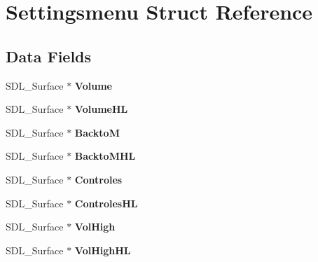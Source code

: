 \hypertarget{structSettingsmenu}{}\section{Settingsmenu Struct Reference}
\label{structSettingsmenu}
\subsection*{Data Fields}
\begin{DoxyCompactItemize}
\item 
\mbox{\label{structSettingsmenu_a1a07d214d54f3ad70eede8e2967cc355}} 
S\+D\+L\+\_\+\+Surface $\ast$ {\bfseries Volume}
\item 
\mbox{\label{structSettingsmenu_a81c4a095e368a057331045fd67a2cc1b}} 
S\+D\+L\+\_\+\+Surface $\ast$ {\bfseries Volume\+HL}
\item 
\mbox{\label{structSettingsmenu_a01ba82775ffa19833635a14f08101a4d}} 
S\+D\+L\+\_\+\+Surface $\ast$ {\bfseries BacktoM}
\item 
\mbox{\label{structSettingsmenu_a97786370a64db769634a86aecf0964a3}} 
S\+D\+L\+\_\+\+Surface $\ast$ {\bfseries Backto\+M\+HL}
\item 
\mbox{\label{structSettingsmenu_a10cecbb80b36a49af342bd81f8ed8f64}} 
S\+D\+L\+\_\+\+Surface $\ast$ {\bfseries Controles}
\item 
\mbox{\label{structSettingsmenu_a0c15b449a1d7bbf6c850ba91c2bb48d4}} 
S\+D\+L\+\_\+\+Surface $\ast$ {\bfseries Controles\+HL}
\item 
\mbox{\label{structSettingsmenu_a81b5e3ae1c94163462d8542238b9d748}} 
S\+D\+L\+\_\+\+Surface $\ast$ {\bfseries Vol\+High}
\item 
\mbox{\label{structSettingsmenu_a92effd2a39373d5b08d42d858faeaa9c}} 
S\+D\+L\+\_\+\+Surface $\ast$ {\bfseries Vol\+High\+HL}
\item 
\mbox{\label{structSettingsmenu_a6adf79176859f0ef6ebf80d04b7f04ee}} 

\end{DoxyCompactItemize}

